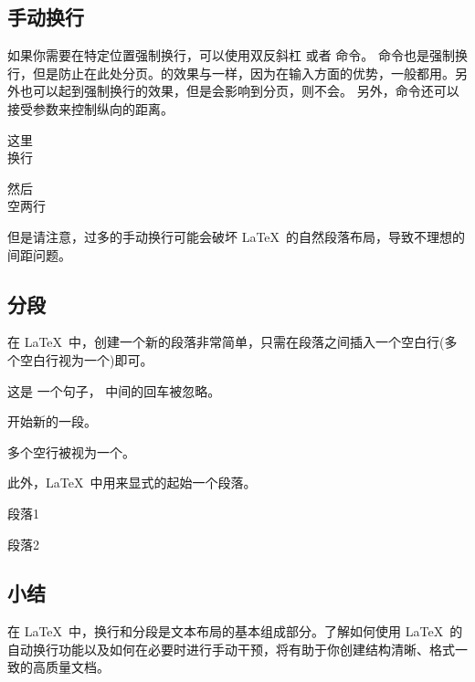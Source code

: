{{{\subsection{手动换行}
如果你需要在特定位置强制换行，可以使用双反斜杠 \texinline{\\} 或者 \texinline{\newline} 命令。
\texinline{\\*}命令也是强制换行，但是防止在此处分页。\texinline{\newline}的效果与\texinline{\\}一样，因为\texinline{\\}在输入方面的优势，一般都用\texinline{\\}。另外\texinline{\linebreak}也可以起到强制换行的效果，但是\texinline{\linebreak}会影响到分页，\texinline{\newline}则不会。
另外，\texinline{\\}命令还可以接受参数来控制纵向的距离。
\begin{texlst}
	这里\\换行

	然后\\[2em]空两行
\end{texlst}

但是请注意，过多的手动换行可能会破坏 \LaTeX\ 的自然段落布局，导致不理想的间距问题。
\subsection{分段}
在 \LaTeX\ 中，创建一个新的段落非常简单，只需在段落之间插入一个空白行(多个空白行视为一个)即可。
\begin{texlst}
	这是
	一个句子，
	中间的回车被忽略。

	开始新的一段。



	多个空行被视为一个。
\end{texlst}

此外，\LaTeX\ 中用\texinline{\par}来显式的起始一个段落。

\begin{texlst}
	段落1\par 段落2
\end{texlst}

\subsection{小结}
在 \LaTeX\ 中，换行和分段是文本布局的基本组成部分。了解如何使用 \LaTeX\ 的自动换行功能以及如何在必要时进行手动干预，将有助于你创建结构清晰、格式一致的高质量文档。

}}}
